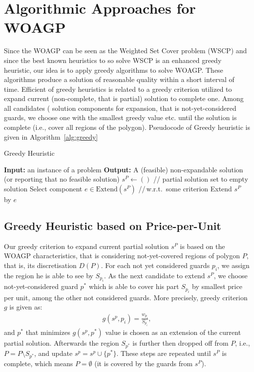 \documentclass[runningheads,a4paper]{llncs}
\begin{document}
     \section{Algorithmic Approaches for WOAGP}
          Since the WOAGP can be seen as the Weighted Set Cover problem (WSCP) and since the best known heuristics to so solve WSCP is an enhanced greedy heuristic, our idea is to apply greedy algorithms to solve WOAGP. These algorithms produce a solution of reasonable quality within a short interval of time. Efficient of greedy heuristics is related to a greedy criterion utilized to expand current (non-complete, that is partial) solution to complete one. Among all candidates ( solution components for expansion, that is not-yet-considered guards, we choose one with the smallest greedy value etc. until the solution is complete (i.e., cover all regions of the polygon).
          Pseudocode of Greedy heuristic is given in Algorithm~\ref{alg:greedy}
          
          \begin{algorithm}[!t] 
          	\caption{Greedy Heuristic}\label{alg:greedy}
          	\begin{algorithmic}[1]
          		\State \textbf{Input:} an instance of a problem
          		\State \textbf{Output:} A (feasible) non-expandable solution (or reporting that no feasible solution)
          		\State $s^{P} \gets ()$ \hspace{0.3cm}// partial solution set to empty solution
          		\State Select component $e \in  \text{Extend}(s^{P})$ \hspace{0.3cm}//\,w.r.t.\  some criterion
          		\State Extend $s^{P}$ by $e$
          		\EndWhile
          	\end{algorithmic}
          \end{algorithm}
      \subsection{Greedy Heuristic based on Price-per-Unit}
       Our greedy criterion to expand current partial solution $s^P$  is based on the WOAGP characteristics, that is considering not-yet-covered regions of polygon $P$, that is, its discretisation $D(P)$. For each not yet considered guards $p_i$, we assign the region he is able to see by $S_{p_i}$. As the next candidate to extend $s^P$, we choose not-yet-considered guard $p^*$ which is able to cover his part $S_{p_i}$ by smallest price per unit, among the other not considered guards. More precisely, greedy criterion $g$ is given as:
       \begin{align}
            g(s^p, p_i) = \frac{w_{p_i}}{S_{p_i}},
       \end{align}
       and $p^*$ that minimizes $g(s^p, p^*)$ value is chosen as an extension of the current partial solution.
       Afterwards the region $S_{p^*}$ is further then dropped off from $P$, i.e., $P=P \setminus S_{p^*}$, and update $s^p= s^p \cup \{p^*\}$.  These steps are repeated until $s^P$ is complete, which means $P = \emptyset$ (it is covered by the guards from $s^P$).  
\end{document}
